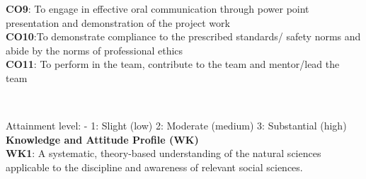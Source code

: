 \begin{titlepage}
{%
\textbf{CO9}: To engage in effective oral communication through power point presentation and demonstration of the project work\\ 
\textbf{CO10}:To demonstrate compliance to the prescribed standards/ safety norms and abide by the norms of professional ethics\\
\textbf{CO11}: To perform in the team, contribute to the team and mentor/lead the team }
\begin{table}[h!]
\caption*{\textbf{CO-PO Mapping}}
\end{table}
\\{\small Attainment level: - 1: Slight (low) 2: Moderate (medium)	3: Substantial (high)
\\\textbf{Knowledge and Attitude Profile (WK)}\\
\textbf{WK1}: A systematic, theory-based understanding of the natural sciences applicable to the discipline and awareness of relevant social sciences.

}
\end{titlepage}
